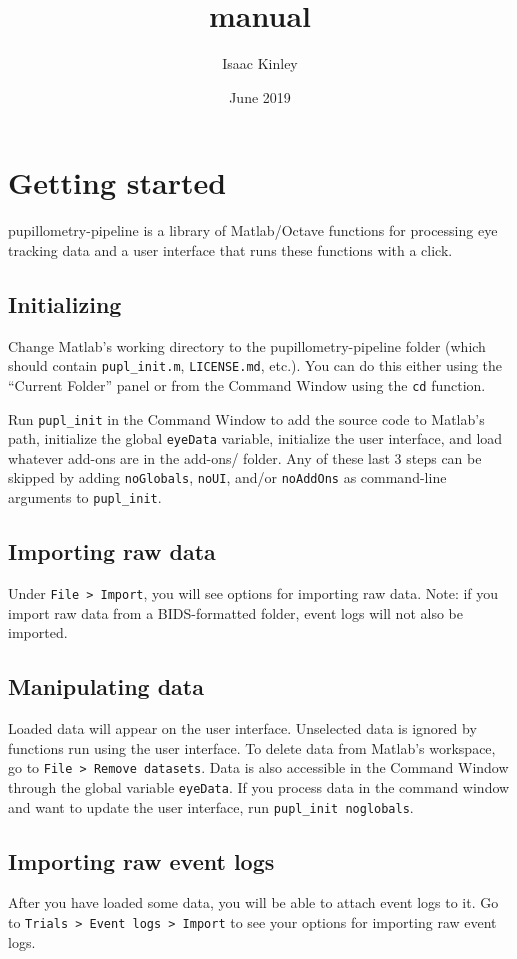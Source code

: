 \documentclass{article}
\title{manual}
\author{Isaac Kinley}
\date{June 2019}
\begin{document}
\maketitle
\tableofcontents

\section{Getting started}
pupillometry-pipeline is a library of Matlab/Octave functions for processing eye tracking data and a user interface that runs these functions with a click.

\subsection{Initializing}
Change Matlab's working directory to the pupillometry-pipeline folder (which should contain \texttt{pupl\_init.m}, \texttt{LICENSE.md}, etc.). You can do this either using the ``Current Folder'' panel or from the Command Window using the \texttt{cd} function.

Run \texttt{pupl\_init} in the Command Window to add the source code to Matlab's path, initialize the global \texttt{eyeData} variable, initialize the user interface, and load whatever add-ons are in the add-ons/ folder. Any of these last 3 steps can be skipped by adding \texttt{noGlobals}, \texttt{noUI}, and/or \texttt{noAddOns} as command-line arguments to \texttt{pupl\_init}.

\subsection{Importing raw data}
Under \texttt{File > Import}, you will see options for importing raw data. Note: if you import raw data from a BIDS-formatted folder, event logs will not also be imported.

\subsection{Manipulating data}
Loaded data will appear on the user interface. Unselected data is ignored by functions run using the user interface. To delete data from Matlab's workspace, go to \texttt{File > Remove datasets}. Data is also accessible in the Command Window through the global variable \texttt{eyeData}. If you process data in the command window and want to update the user interface, run \texttt{pupl\_init noglobals}.

\subsection{Importing raw event logs}
After you have loaded some data, you will be able to attach event logs to it. Go to \texttt{Trials > Event logs > Import} to see your options for importing raw event logs.
\end{document}
